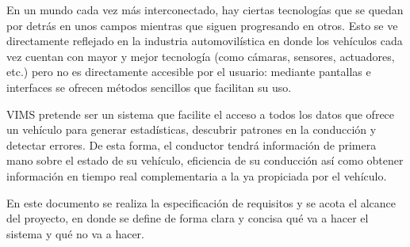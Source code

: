 En un mundo cada vez más interconectado, hay ciertas tecnologías que se quedan
por detrás en unos campos mientras que siguen progresando en otros. Esto se ve
directamente reflejado en la industria automovilística en donde los vehículos
cada vez cuentan con mayor y mejor tecnología (como cámaras, sensores, actuadores,
etc.) pero no es directamente accesible por el usuario: mediante pantallas e
interfaces se ofrecen métodos sencillos que facilitan su uso.

\ac{VIMS} pretende ser un sistema que facilite el acceso a todos los datos que
ofrece un vehículo para generar estadísticas, descubrir patrones en la conducción
y detectar errores. De esta forma, el conductor tendrá información de primera
mano sobre el estado de su vehículo, eficiencia de su conducción así como obtener
información en tiempo real complementaria a la ya propiciada por el vehículo.

En este documento se realiza la especificación de requisitos y se acota el
alcance del proyecto, en donde se define de forma clara y concisa qué va a hacer
el sistema y qué no va a hacer.